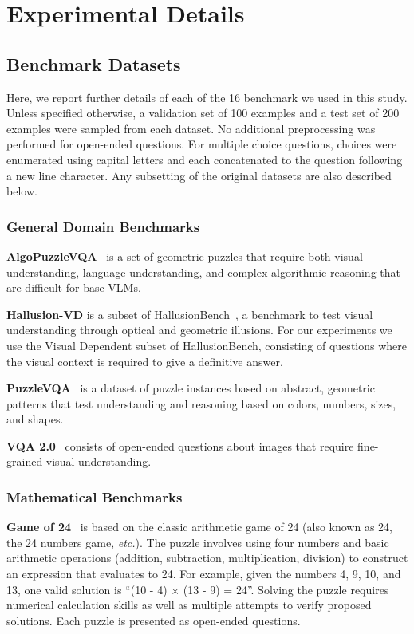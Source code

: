 
\clearpage

\section{Experimental Details}
\label{app:exp_details}

\subsection{Benchmark Datasets}
\label{app:benchmark_datasets}
Here, we report further details of each of the 16 benchmark we used in this study. Unless specified otherwise, a validation set of 100 examples and a test set of 200 examples were sampled from each dataset. No additional preprocessing was performed for open-ended questions. For multiple choice questions, choices were enumerated using capital letters and each concatenated to the question following a new line character. Any subsetting of the original datasets are also described below.

\subsubsection{General Domain Benchmarks}

\textbf{AlgoPuzzleVQA}~\cite{ghosal2024language} is a set of geometric puzzles that require both visual understanding, language understanding, and complex algorithmic reasoning that are difficult for base VLMs. 

\textbf{Hallusion-VD} is a subset of HallusionBench~\cite{guan2024hallusionbench}, a benchmark to test visual understanding through optical and geometric illusions. For our experiments we use the Visual Dependent subset of HallusionBench, consisting of questions where the visual context is required to give a definitive answer.

\textbf{PuzzleVQA}~\cite{chia2024puzzlevqa} is a dataset of puzzle instances based on abstract, geometric patterns that test understanding and reasoning based on colors, numbers, sizes, and shapes.

\textbf{VQA 2.0}~\cite{goyal2017making} consists of open-ended questions about images that require fine-grained visual understanding.

\subsubsection{Mathematical Benchmarks}

\textbf{Game of 24}~\cite{24game} is based on the classic arithmetic game of 24 (also known as 24, the 24 numbers game, \textit{etc.}). The puzzle involves using four numbers and basic arithmetic operations (addition, subtraction, multiplication, division) to construct an expression that evaluates to 24. For example, given the numbers 4, 9, 10, and 13, one valid solution is ``(10 - 4) × (13 - 9) = 24''. Solving the puzzle requires numerical calculation skills as well as multiple attempts to verify proposed solutions. Each puzzle is presented as open-ended questions.

